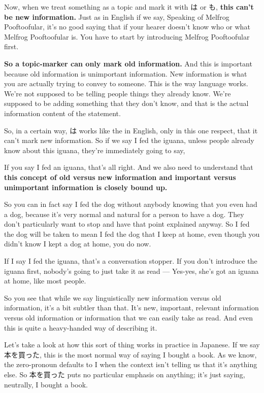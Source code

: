 \thinrule

Now, when we treat something as a topic and mark it with は or も, {\bf this can't be new information.} Just as in English if we say, Speaking of Melfrog Pooftoofular, it's no good saying that if your hearer doesn't know who or what Melfrog Pooftoofular is. You have to start by introducing Melfrog Pooftoofular first.

{\bf So a topic-marker can only mark old information.} And this is important because old information is unimportant information. New information is what you are actually trying to convey to someone. This is the way language works. We're not supposed to be telling people things they already know. We're supposed to be adding something that they don't know, and that is the actual information content of the statement.

So, in a certain way, は works like the in English, only in this one respect, that it can't mark new information. So if we say I fed the iguana, unless people already know about this iguana, they're immediately going to say, 

If you say I fed an iguana, that's all right. And we also need to understand that {\bf this concept of old versus new information and important versus unimportant information is closely bound up.}

So you can in fact say I fed the dog without anybody knowing that you even had a dog, because it's very normal and natural for a person to have a dog. They don't particularly want to stop and have that point explained anyway. So I fed the dog will be taken to mean I fed the dog that I keep at home, even though you didn't know I kept a dog at home, you do now.

If I say I fed the iguana, that's a conversation stopper. If you don't introduce the iguana first, nobody's going to just take it as read --- Yes-yes, she's got an iguana at home, like most people.

So you see that while we say linguistically new information versus old information, it's a bit subtler than that. It's new, important, relevant information versus old information or information that we can easily take as read. And even this is quite a heavy-handed way of describing it.

Let's take a look at how this sort of thing works in practice in Japanese. If we say 本を買った, this is the most normal way of saying I bought a book. As we know, the zero-pronoun defaults to I when the context isn't telling us that it's anything else. So 本を買った puts no particular emphasis on anything; it's just saying, neutrally, I bought a book.

